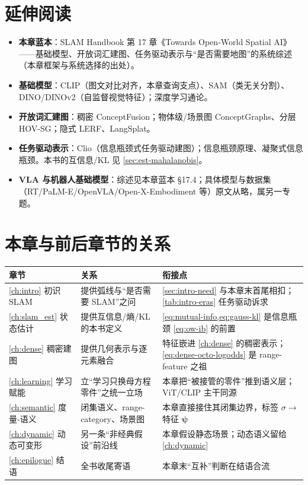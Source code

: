 \section*{延伸阅读}
\begin{itemize}
  \item \textbf{本章蓝本}：SLAM Handbook\cite{paull2026openworld} 第 17 章《Towards Open-World Spatial AI》——基础模型、开放词汇建图、任务驱动表示与“是否需要地图”的系统综述（本章框架与系统选择的出处）。
  \item \textbf{基础模型}：CLIP\cite{radford2021clip}（图文对比对齐，本章查询支点）、SAM\cite{kirillov2023sam}（类无关分割）、DINO/DINOv2\cite{caron2021dino,oquab2024dinov2}（自监督视觉特征）；深度学习通论\cite{goodfellow2016deeplearning}。
  \item \textbf{开放词汇建图}：稠密 ConceptFusion\cite{jatavallabhula2023conceptfusion}；物体级/场景图 ConceptGraphs\cite{gu2024conceptgraphs}、分层 HOV-SG\cite{werby2024hovsg}；隐式 LERF\cite{kerr2023lerf}、LangSplat\cite{qin2024langsplat}。
  \item \textbf{任务驱动表示}：Clio\cite{maggio2024clio}（信息瓶颈式任务驱动建图）；信息瓶颈原理\cite{tishby1999ib}、凝聚式信息瓶颈\cite{slonim1999aib}。本书的互信息/KL 见 \cref{sec:est-mahalanobis}。
  \item \textbf{VLA 与机器人基础模型}：综述见本章蓝本\cite{paull2026openworld} §17.4；具体模型与数据集（RT/PaLM-E/OpenVLA/Open-X-Embodiment 等）原文从略，属另一专题。
\end{itemize}

\section*{本章与前后章节的关系}
\begin{table}[H]\centering\small
\begin{tabularx}{\linewidth}{lLL}
\toprule
章节 & 关系 & 衔接点 \\
\midrule
\cref{ch:intro} 初识 SLAM & 提供弧线与“是否需要 SLAM”之问 & \cref{sec:intro-need} 与本章末首尾相扣；\cref{tab:intro-eras} 任务驱动诉求 \\
\cref{ch:slam_est} 状态估计 & 提供互信息/熵/KL 的本书定义 & \cref{eq:mutual-info,eq:gauss-kl} 是信息瓶颈 \cref{eq:ow-ib} 的前置 \\
\cref{ch:dense} 稠密建图 & 提供几何表示与逐元素融合 & 特征嵌进 \cref{ch:dense} 的稠密表示；\cref{eq:dense-octo-logodds} 是 range-feature 之祖 \\
\cref{ch:learning} 学习赋能 & 立“学习只换母方程零件”之统一立场 & 本章把“被接管的零件”推到语义层；ViT/CLIP 主干同源 \\
\cref{ch:semantic} 度量-语义 & 闭集语义、range-category、场景图 & 本章直接接住其闭集边界，标签 $\sigma\to$ 特征 $\boldsymbol\psi$ \\
\cref{ch:dynamic} 动态可变形 & 另一条“非经典假设”前沿线 & 本章假设静态场景；动态语义留给 \cref{ch:dynamic} \\
\cref{ch:epilogue} 结语 & 全书收尾寄语 & 本章末“互补”判断在结语合流 \\
\bottomrule
\end{tabularx}
\end{table}

